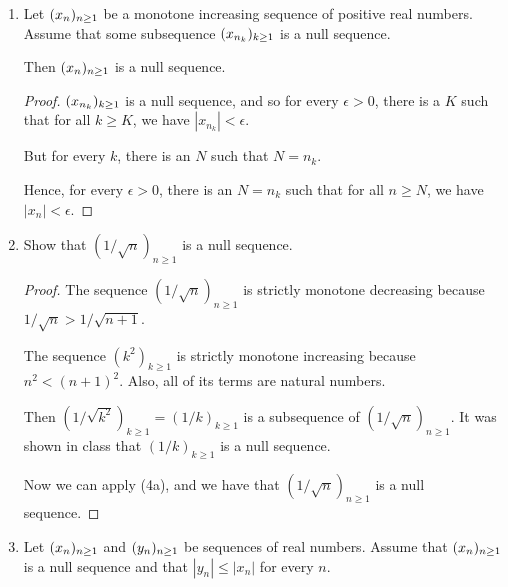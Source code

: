 \documentclass[12pt, letterpaper]{article}
\begin{document}
\begin{enumerate}[label=\bfseries4\alph*)]

\item Let $(x_n)_{n \geq 1}$ be a monotone increasing sequence of positive real numbers.
Assume that some subsequence $(x_{n_k})_{k \geq 1}$ is a null sequence.

Then $(x_n)_{n \geq 1}$ is a null sequence.

\begin{proof}
	$(x_{n_k})_{k \geq 1}$ is a null sequence, and so for every $\epsilon > 0$, there
	is a $K$ such that for all $k \geq K$, we have ${|x_{n_k}| < \epsilon}$.

	But for every $k$, there is an $N$ such that $N = n_k$. 

	Hence, for every $\epsilon > 0$, there is an $N = n_k$ such that for all 
	$n \geq N$, we have ${|x_n| < \epsilon}$.
\end{proof}

\item Show that $({1/\sqrt{n}})_{n\geq1}$ is a null sequence.

\begin{proof}
	
	The sequence $({1/\sqrt{n}})_{n\geq1}$ is strictly monotone decreasing because
	$1/\sqrt{n} > 1/\sqrt{n+1}$. 

	The sequence $(k^2)_{k\geq1}$ is strictly monotone increasing because 
	$n^2 < (n+1)^2$. Also, all of its terms are natural numbers.

	Then $(1/\sqrt{k^2})_{k\geq1} = (1/k)_{k\geq1}$ is a subsequence of 
	$({1/\sqrt{n}})_{n\geq1}$. It was shown in class that $(1/k)_{k\geq1}$ is a 
	null sequence.

	Now we can apply (4a), and we have that $({1/\sqrt{n}})_{n\geq1}$ is a null sequence.
\end{proof}

\item Let $(x_n)_{n \geq 1}$ and $(y_n)_{n \geq 1}$ be sequences of real numbers. Assume that
$(x_n)_{n \geq 1}$ is a null sequence and that $|y_n| \leq |x_n|$ for every $n$. 


\end{enumerate}
\end{document}
